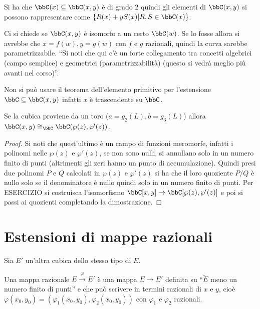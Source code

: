 \begin{osservazione}
Si ha che $\bbC(x)\subseteq\bbC(x,y)$ è di grado $2$ quindi gli elementi di $\bbC(x,y)$ si possono rappresentare come $\{ R(x)+y S(x) | R,S \in \bbC(x)\}$.
\end{osservazione}

Ci si chiede se $\bbC(x,y)$ è isomorfo a un certo $\bbC(w)$.
Se lo fosse allora si avrebbe che $x=f(w), y=g(w)$ con $f$ e $g$ razionali, quindi la curva sarebbe parametrizzabile. ``Si noti che qui c'è un forte collegamento tra concetti algebrici (campo semplice) e geometrici (parametrizzabilità) (questo si vedrà meglio più avanti nel corso)''.

\begin{osservazione}
Non si può usare il teorema dell'elemento primitivo per l'estensione $\bbC\subseteq\bbC(x,y)$ infatti $x$ è trascendente su $\bbC$.
\end{osservazione}

\begin{proposizione}Se la cubica proviene da un toro ($a = g_2(L), b = g_3(L)$) allora $\bbC(x,y)\cong_{\bbC}\bbC(\wp(z),\wp'(z))$.
\end{proposizione}

\begin{proof}
Si noti che quest'ultimo è un campo di funzioni meromorfe, infatti i polinomi nelle $\wp(z)$ e $\wp'(z)$, se non sono nulli, si annullano solo in un numero finito di punti (altrimenti gli zeri hanno un punto di accumulazione). Quindi presi due polinomi $P$ e $Q$ calcolati in $\wp(z)$ e $\wp'(z)$ si ha che il loro quoziente $P/Q$ è nullo solo se il denominatore è nullo quindi solo in un numero finito di punti. Per ESERCIZIO si costruisca l'isomorfismo $\bbC[x,y]\rightarrow\bbC[\wp(z),\wp'(z)]$ e poi si passi ai quozienti completando la dimostrazione.
\end{proof}


\section{Estensioni di mappe razionali}
Sia $E'$ un'altra cubica dello stesso tipo di $E$.

\begin{definizione}
	Una mappa razionale $E \overset{\varphi}{\rightarrow} E'$ è una mappa $E\rightarrow E'$ definita su ``$\tilde{E}$ meno un numero finito di punti'' e che può scrivere in termini razionali di $x$ e $y$, cioè $\varphi(x_0,y_0) = (\varphi_1(x_0,y_0),\varphi_2(x_0,y_0) )$ con $\varphi_1$ e $\varphi_2$ razionali.
\end{definizione}

